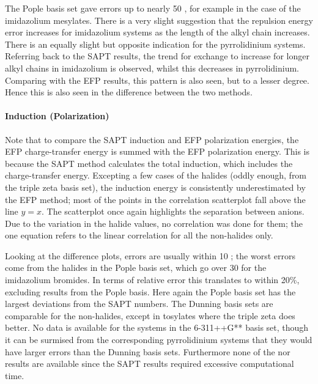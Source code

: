 The Pople basis set gave errors up to nearly 50 \enUnit, for example in the case of the imidazolium mesylates.
There is a very slight suggestion that the repulsion energy error increases for imidazolium systems as the length of the alkyl chain increases. 
There is an equally slight but opposite indication for the pyrrolidinium systems.
Referring back to the SAPT results, the trend for exchange to increase for longer alkyl chains in imidazolium is observed, whilst this decreases in pyrrolidinium. 
Comparing with the EFP results, this pattern is also seen, but to a lesser degree.
Hence this is also seen in the difference between the two methods.



\paragraph{Induction (Polarization)}
Note that to compare the SAPT induction and EFP polarization energies, the EFP charge-transfer energy is summed with the EFP polarization energy. 
This is because the SAPT method calculates the total induction, which includes the charge-transfer energy.
Excepting a few cases of the halides (oddly enough, from the triple zeta basis set), the induction energy is consistently underestimated by the EFP method; most of the points in the correlation scatterplot fall above the line $ y= x $.
The scatterplot once again highlights the separation between anions.
Due to the variation in the halide values, no correlation was done for them; the one equation refers to the linear correlation for all the non-halides only.

Looking at the difference plots, errors are usually within 10 \enUnit; the worst errors come from the halides in the Pople basis set, which go over 30 \enUnit for the imidazolium bromides.  
In terms of relative error this translates to within 20\%, excluding results from the Pople basis.
Here again the Pople basis set has the largest deviations from the SAPT numbers. 
The Dunning basis sets are comparable for the non-halides, except in tosylates where the triple zeta does better. 
No data is available for the  systems in the 6-311++G** basis set, though it can be surmised from the corresponding pyrrolidinium systems that they would have larger errors than the Dunning basis sets.
Furthermore none of the  nor  results are available since the SAPT results required excessive computational time.

